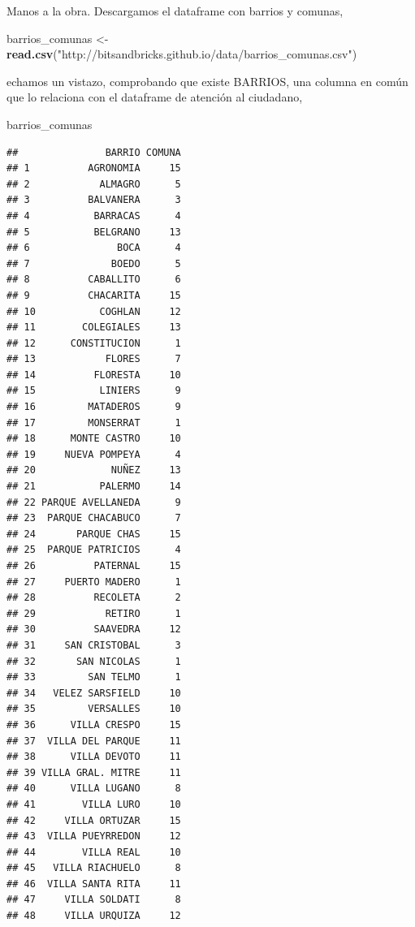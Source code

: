 \documentclass[spanish,]{book}
\newenvironment{Shaded}{\begin{snugshade}}{\end{snugshade}}
\newcommand{\KeywordTok}[1]{\textcolor[rgb]{0.13,0.29,0.53}{\textbf{#1}}}
\newcommand{\NormalTok}[1]{#1}
\newcommand{\StringTok}[1]{\textcolor[rgb]{0.31,0.60,0.02}{#1}}
\begin{document}
Manos a la obra. Descargamos el dataframe con barrios y comunas,

\begin{Shaded}
\begin{Highlighting}[]
\NormalTok{barrios_comunas <-}\StringTok{ }\KeywordTok{read.csv}\NormalTok{(}\StringTok{"http://bitsandbricks.github.io/data/barrios_comunas.csv"}\NormalTok{)}
\end{Highlighting}
\end{Shaded}

echamos un vistazo, comprobando que existe BARRIOS, una columna en común que lo relaciona con el dataframe de atención al ciudadano,

\begin{Shaded}
\begin{Highlighting}[]
\NormalTok{barrios_comunas}
\end{Highlighting}
\end{Shaded}

\begin{verbatim}
##               BARRIO COMUNA
## 1          AGRONOMIA     15
## 2            ALMAGRO      5
## 3          BALVANERA      3
## 4           BARRACAS      4
## 5           BELGRANO     13
## 6               BOCA      4
## 7              BOEDO      5
## 8          CABALLITO      6
## 9          CHACARITA     15
## 10           COGHLAN     12
## 11        COLEGIALES     13
## 12      CONSTITUCION      1
## 13            FLORES      7
## 14          FLORESTA     10
## 15           LINIERS      9
## 16         MATADEROS      9
## 17         MONSERRAT      1
## 18      MONTE CASTRO     10
## 19     NUEVA POMPEYA      4
## 20             NUÑEZ     13
## 21           PALERMO     14
## 22 PARQUE AVELLANEDA      9
## 23  PARQUE CHACABUCO      7
## 24       PARQUE CHAS     15
## 25  PARQUE PATRICIOS      4
## 26          PATERNAL     15
## 27     PUERTO MADERO      1
## 28          RECOLETA      2
## 29            RETIRO      1
## 30          SAAVEDRA     12
## 31     SAN CRISTOBAL      3
## 32       SAN NICOLAS      1
## 33         SAN TELMO      1
## 34   VELEZ SARSFIELD     10
## 35         VERSALLES     10
## 36      VILLA CRESPO     15
## 37  VILLA DEL PARQUE     11
## 38      VILLA DEVOTO     11
## 39 VILLA GRAL. MITRE     11
## 40      VILLA LUGANO      8
## 41        VILLA LURO     10
## 42     VILLA ORTUZAR     15
## 43  VILLA PUEYRREDON     12
## 44        VILLA REAL     10
## 45   VILLA RIACHUELO      8
## 46  VILLA SANTA RITA     11
## 47     VILLA SOLDATI      8
## 48     VILLA URQUIZA     12
\end{verbatim}
\end{document}
